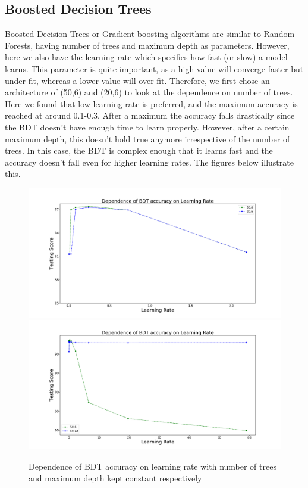 \subsection{Boosted Decision Trees}
Boosted Decision Trees or Gradient boosting algorithms are similar to Random Forests, having number of trees and maximum depth as parameters. However, here we also have the learning rate which specifies how fast (or slow) a model learns. This parameter is quite important, as a high value will converge faster but under-fit, whereas a lower value will over-fit. Therefore, we first chose an architecture of (50,6) and (20,6) to look at the dependence on number of trees. Here we found that low learning rate is preferred, and the maximum accuracy is reached at around 0.1-0.3. After a maximum the accuracy falls drastically since the BDT doesn't have enough time to learn properly. However, after a certain maximum depth, this doesn't hold true anymore irrespective of the number of trees. In this case, the BDT is complex enough that it learns fast and the accuracy doesn't fall even for higher learning rates. The figures below illustrate this.\\



\begin{figure}[h]
\includegraphics[width=\twopicsp\textwidth]{plots/lr.pdf}
\includegraphics[width=\twopicsp\textwidth]{plots/lr3.pdf}
\caption{Dependence of BDT accuracy on learning rate with number of trees and maximum depth kept constant respectively}
\label{fig:Maps_data}
\end{figure}


